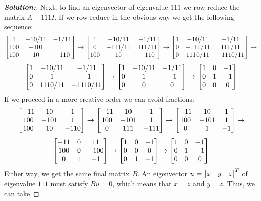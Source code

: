 \documentclass[a4paper]{amsart}
\theoremstyle{definition}
\newenvironment{solution}{\begin{proof}[\textbf{Solution:}] \vphantom{u}}{\end{proof}}
\begin{document}
\begin{solution}
 Next, to find an eigenvector of eigenvalue $111$ we row-reduce the
 matrix $A-111I$.  If we row-reduce in the obvious way we get the
 following sequence:
 \[
  \left[\begin{matrix}
  1&-10/11&-1/11\\
  100&-101&1\\
  100&10&-110\\
  \end{matrix}\right]
  \to
  \left[\begin{matrix}
  1&-10/11&-1/11\\
  0&-111/11&111/11\\
  100&10&-110\\
  \end{matrix}\right]
  \to
  \left[\begin{matrix}
  1&-10/11&-1/11\\
  0&-111/11&111/11\\
  0&1110/11&-1110/11\\
  \end{matrix}\right]
  \to
  \] \[
  \left[\begin{matrix}
  1&-10/11&-1/11\\
  0&1&-1\\
  0&1110/11&-1110/11\\
  \end{matrix}\right]
  \to
  \left[\begin{matrix}
  1&-10/11&-1/11\\
  0&1&-1\\
  0&0&0\\
  \end{matrix}\right]
  \to
  \left[\begin{matrix}
  1&0&-1\\
  0&1&-1\\
  0&0&0\\
  \end{matrix}\right]
 \]
 If we proceed in a more creative order we can avoid fractions:
 \[ \left[\begin{matrix}
     -11 &   10 & 1 \\
     100 & -101 & 1 \\
     100 &   10 & -110
    \end{matrix}\right] 
    \to
    \left[\begin{matrix}
     -11 &   10 & 1 \\
     100 & -101 & 1 \\
       0 &  111 & -111
    \end{matrix}\right] 
    \to
    \left[\begin{matrix}
     -11 &   10 & 1 \\
     100 & -101 & 1 \\
       0 &    1 & -1
    \end{matrix}\right] 
    \to
  \] \[
    \left[\begin{matrix}
     -11 &    0 & 11 \\
     100 &    0 & -100 \\
       0 &    1 & -1
    \end{matrix}\right] 
    \to
    \left[\begin{matrix}
       1 &    0 & -1 \\
       0 &    0 &  0 \\
       0 &    1 & -1
    \end{matrix}\right] 
    \to
    \left[\begin{matrix}
       1 &    0 & -1 \\
       0 &    1 & -1 \\
       0 &    0 &  0 
    \end{matrix}\right] 
 \]
 Either way, we get the same final matrix $B$.  An eigenvector
 $u=\left[\begin{matrix} x&y&z\end{matrix}\right]^T$ of eigenvalue $111$ must satisfy $Bu=0$, which
 means that $x=z$ and $y=z$.  Thus, we can take

\end{solution}
\end{document}

